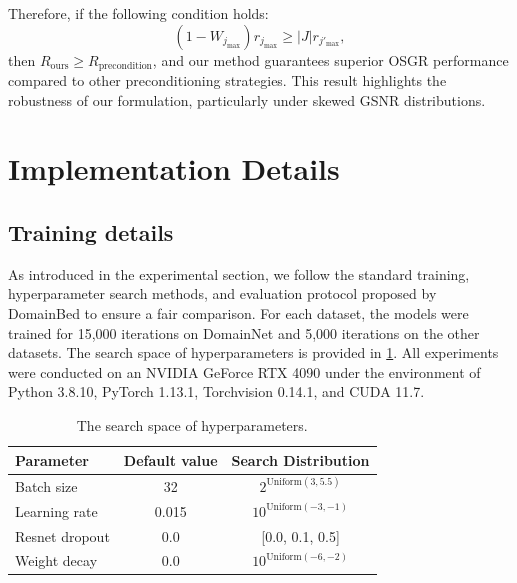 \documentclass{article}
\theoremstyle{plain}
\theoremstyle{definition}
\theoremstyle{remark}
\begin{document}
Therefore, if the following condition holds:
\begin{equation}
(1 - W_{j_{\text{max}}}) r_{j_{\text{max}}} \ge |J| r_{j'_{\text{max}}},
\end{equation}
then \( R_{\text{ours}} \ge R_{\text{precondition}} \), and our method guarantees superior OSGR performance compared to other preconditioning strategies. This result highlights the robustness of our formulation, particularly under skewed GSNR distributions.


\section{Implementation Details}
\label{ap: Implementation Details}
\subsection{Training details}
As introduced in the experimental section, we follow the standard training, hyperparameter search methods, and evaluation protocol proposed by DomainBed \cite{domainbed} to ensure a fair comparison. For each dataset, the models were trained for 15,000 iterations on DomainNet and 5,000 iterations on the other datasets. The search space of hyperparameters is provided in \cref{tab:hp-search-space}. All experiments were conducted on an NVIDIA GeForce RTX 4090 under the environment of Python 3.8.10, PyTorch 1.13.1, Torchvision 0.14.1, and CUDA 11.7.
\begin{table}[ht]
\caption{The search space of hyperparameters.}
\label{tab:hp-search-space}
\vskip 0.15in
\begin{center}
\begin{small}
\begin{sc}
\begin{tabular}{lcc}
\toprule
Parameter & Default value & Search Distribution \\
\midrule
Batch size      & 32    & $2^{\text{Uniform}(3, 5.5)}$ \\
Learning rate   & 0.015 & $10^{\text{Uniform}(-3, -1)}$\\
Resnet dropout  & 0.0   & [0.0, 0.1, 0.5] \\
Weight decay    & 0.0   & $10^{\text{Uniform}(-6, -2)}$ \\
\bottomrule
\end{tabular}
\end{sc}
\end{small}
\end{center}
\vskip -0.1in
\end{table}
\clearpage
\end{document}
